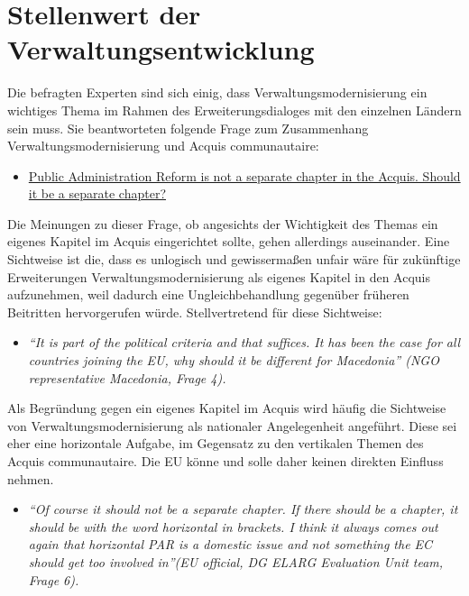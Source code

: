 \section{Stellenwert der Verwaltungsentwicklung }
Die befragten Experten sind sich einig, dass Verwaltungsmodernisierung ein wichtiges Thema im Rahmen des Erweiterungsdialoges mit den einzelnen Ländern sein muss. Sie beantworteten folgende Frage zum Zusammenhang Verwaltungsmodernisierung und Acquis communautaire:
\begin{itemize}[label={}]
\item \ul{Public Administration Reform is not a separate chapter in the Acquis. Should it be a separate chapter? }
\end{itemize}

Die Meinungen zu dieser Frage, ob angesichts der Wichtigkeit des Themas ein eigenes Kapitel im Acquis eingerichtet sollte, gehen allerdings auseinander. Eine Sichtweise ist die, dass es unlogisch und gewissermaßen unfair wäre für zukünftige Erweiterungen Verwaltungsmodernisierung als eigenes Kapitel in den Acquis aufzunehmen, weil dadurch eine Ungleichbehandlung gegenüber früheren Beitritten hervorgerufen würde. Stellvertretend für diese Sichtweise:
\begin{itemize}[label={}]
\item \textit{“It is part of the political criteria and that suffices. It has been the case for all countries joining the EU, why should it be different for Macedonia” (NGO representative Macedonia, Frage 4).
}
\end{itemize}
Als Begründung gegen ein eigenes Kapitel im Acquis wird häufig die Sichtweise von Verwaltungsmodernisierung als nationaler Angelegenheit angeführt. Diese sei eher eine horizontale Aufgabe, im Gegensatz zu den vertikalen Themen des Acquis communautaire. Die EU könne und solle daher keinen direkten Einfluss nehmen.

\begin{itemize}[label={}]
\item \textit{“Of course it should not be a separate chapter. If there should be a chapter, it should be with the word horizontal in brackets. I think it always comes out again that horizontal PAR is a domestic issue and not something the EC should get too involved in”(EU official, DG ELARG Evaluation Unit team, Frage 6). }
\end{itemize}

